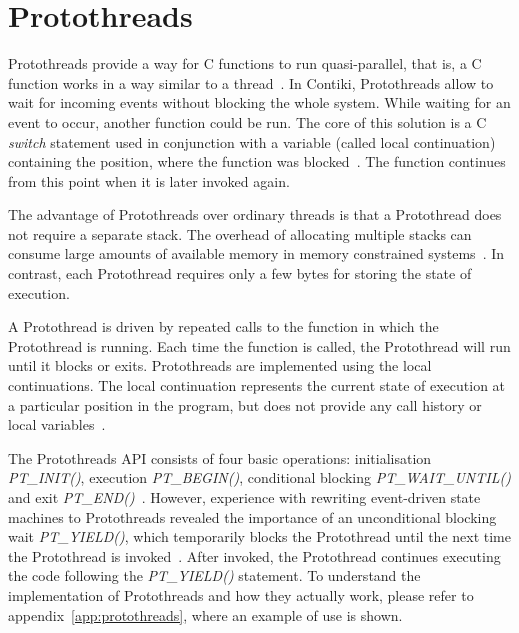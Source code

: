 
\section{Protothreads}\label{sec:contiki-protothreads}
Protothreads provide a way for C functions to run quasi-parallel,
that is, a C function works in a way similar to a thread~\cite{paper-protothreads}.
In Contiki, Protothreads allow to wait for incoming events without blocking the whole system.
While waiting for an event to occur, another function could be run.
The core of this solution is a C {\it switch} statement used in conjunction with a variable (called local continuation)
containing the position, where the function was blocked~\cite{paper-protothreads}.
The function continues from this point when it is later invoked again.

The advantage of Protothreads over ordinary threads is that a Protothread does not require a separate stack.
The overhead of allocating multiple stacks can consume large amounts of
available memory in memory constrained systems~\cite{paper-protothreads}.
In contrast, each Protothread requires only a few bytes for storing the state of execution.

A Protothread is driven by repeated calls to the function in which the Protothread is running.
Each time the function is called, the Protothread will run until it blocks or exits.
Protothreads are implemented using the local continuations. The local continuation represents the current state
of execution at a particular position in the program, but does not provide any call history or local variables~\cite{contiki-docs}.

The Protothreads API consists of four basic operations: initialisation {\it{PT\_INIT()}}, execution {\it{PT\_BEGIN()}},
conditional blocking {\it{PT\_WAIT\_UNTIL()}} and exit {\it{PT\_END()}}~\cite{paper-protothreads}.
However, experience with rewriting event-driven state machines to Protothreads revealed
the importance of an unconditional blocking wait {\it{PT\_YIELD()}},
which temporarily blocks the Protothread until the next time the Protothread is invoked~\cite{thesis-programming}.
After invoked, the Protothread continues executing the code following the {\it{PT\_YIELD()}} statement.
To understand the implementation of Protothreads and how they actually work,
please refer to appendix~\ref{app:protothreads}, where an example of use is shown.

